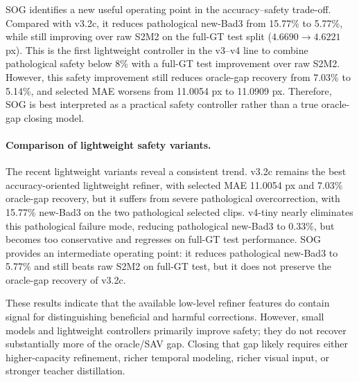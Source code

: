\documentclass[11pt,a4paper]{article}
\begin{document}
SOG identifies a new useful operating point in the accuracy--safety trade-off.
Compared with v3.2c, it reduces pathological new-Bad3 from 15.77\% to 5.77\%,
while still improving over raw S2M2 on the full-GT test split
(\(4.6690 \rightarrow 4.6221\) px). This is the first lightweight controller in
the v3--v4 line to combine pathological safety below 8\% with a full-GT test
improvement over raw S2M2. However, this safety improvement still reduces
oracle-gap recovery from 7.03\% to 5.14\%, and selected MAE worsens from
11.0054 px to 11.0909 px. Therefore, SOG is best interpreted as a practical
safety controller rather than a true oracle-gap closing model.

\paragraph{Comparison of lightweight safety variants.}
The recent lightweight variants reveal a consistent trend. v3.2c remains the
best accuracy-oriented lightweight refiner, with selected MAE 11.0054 px and
7.03\% oracle-gap recovery, but it suffers from severe pathological
overcorrection, with 15.77\% new-Bad3 on the two pathological selected clips.
v4-tiny nearly eliminates this pathological failure mode, reducing pathological
new-Bad3 to 0.33\%, but becomes too conservative and regresses on full-GT test
performance. SOG provides an intermediate operating point: it reduces
pathological new-Bad3 to 5.77\% and still beats raw S2M2 on full-GT test, but it
does not preserve the oracle-gap recovery of v3.2c.

These results indicate that the available low-level refiner features do contain
signal for distinguishing beneficial and harmful corrections. However, small
models and lightweight controllers primarily improve safety; they do not recover
substantially more of the oracle/SAV gap. Closing that gap likely requires either
higher-capacity refinement, richer temporal modeling, richer visual input, or
stronger teacher distillation.
\end{document}
